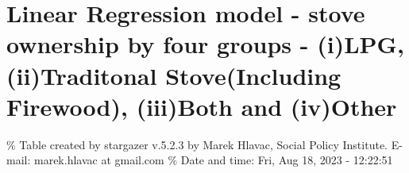 \documentclass[
]{article}
\begin{document}
\hypertarget{linear-regression-model---stove-ownership-by-four-groups---ilpg-iitraditonal-stoveincluding-firewood-iiiboth-and-ivother}{%
\section{Linear Regression model - stove ownership by four groups -
(i)LPG, (ii)Traditonal Stove(Including Firewood), (iii)Both and
(iv)Other}\label{linear-regression-model---stove-ownership-by-four-groups---ilpg-iitraditonal-stoveincluding-firewood-iiiboth-and-ivother}}

\begingroup\setlength{\tabcolsep}{1pt}

\renewcommand{\arraystretch}{0.7}

\% Table created by stargazer v.5.2.3 by Marek Hlavac, Social Policy
Institute. E-mail: marek.hlavac at gmail.com \% Date and time: Fri, Aug
18, 2023 - 12:22:51
\end{document}
